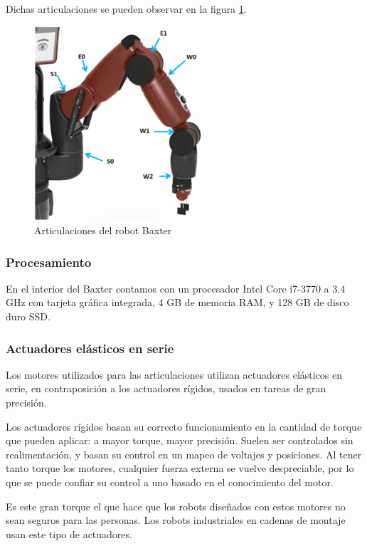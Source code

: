 Dichas articulaciones se pueden observar en la figura \ref{fig:desarrollo/joints}.

\begin{figure}[]
	\centering
	\includegraphics[width=2.5in]{imagenes/metodos/baxter_joint_names.png}
	\caption{Articulaciones del robot Baxter}
	\label{fig:desarrollo/joints}
\end{figure}

\subsubsection{Procesamiento}
En el interior del Baxter contamos con un procesador Intel Core i7-3770 a 3.4 GHz con tarjeta gráfica integrada, 4 GB de memoria RAM, y 128 GB de disco duro SSD.

\subsubsection{Actuadores elásticos en serie}
Los motores utilizados para las articulaciones utilizan actuadores elásticos en serie, en contraposición a los actuadores rígidos, usados en tareas de gran precisión.

Los actuadores rígidos basan su correcto funcionamiento en la cantidad de torque que pueden aplicar: a mayor torque, mayor precisión. Suelen ser controlados sin realimentación, y basan su control en un mapeo de voltajes y posiciones. Al tener tanto torque los motores, cualquier fuerza externa se vuelve despreciable, por lo que se puede confiar su control a uno basado en el conocimiento del motor.

Es este gran torque el que hace que los robots diseñados con estos motores no sean seguros para las personas. Los robots industriales en cadenas de montaje usan este tipo de actuadores.

